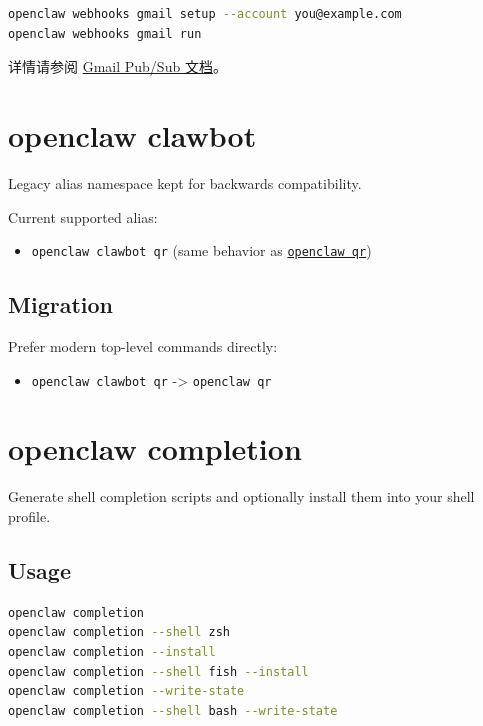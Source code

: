 \begin{lstlisting}[language=bash]
openclaw webhooks gmail setup --account you@example.com
openclaw webhooks gmail run
\end{lstlisting}


详情请参阅 \href{/automation/gmail-pubsub}{Gmail Pub/Sub 文档}。


\clearpage
\section{openclaw clawbot}


Legacy alias namespace kept for backwards compatibility.

Current supported alias:

\begin{itemize}
  \item \texttt{openclaw clawbot qr} (same behavior as \href{/cli/qr}{\texttt{openclaw qr}})
\end{itemize}


\subsection{Migration}


Prefer modern top-level commands directly:

\begin{itemize}
  \item \texttt{openclaw clawbot qr} -> \texttt{openclaw qr}
\end{itemize}



\clearpage

\section{openclaw completion}


Generate shell completion scripts and optionally install them into your shell profile.

\subsection{Usage}


\begin{lstlisting}[language=bash]
openclaw completion
openclaw completion --shell zsh
openclaw completion --install
openclaw completion --shell fish --install
openclaw completion --write-state
openclaw completion --shell bash --write-state
\end{lstlisting}


